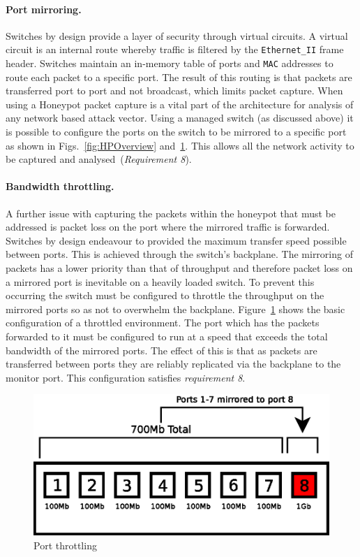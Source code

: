 \documentclass{llncs}
\begin{document}
\paragraph{Port mirroring.}
Switches by design provide a layer of security through virtual
circuits. A virtual circuit is an internal route whereby traffic is filtered by
the \texttt{Ethernet\_II} frame header. Switches maintain an in-memory table of
ports and \texttt{MAC} addresses to route each packet to a specific port. The
result of this routing is that packets are transferred port to port and not
broadcast, which limits packet capture. When using a Honeypot packet capture is
a vital part of the architecture for analysis of any network based attack
vector. Using a managed switch (as discussed above) it is possible to configure
the ports on the switch to be mirrored to a specific port as shown in
Figs.~\ref{fig:HPOverview} and~\ref{fig:throttling}. This allows all the
network activity to be captured and analysed~(\emph{Requirement 8}).

\paragraph{Bandwidth throttling.} 
A further issue with capturing the packets within the honeypot that must be
addressed is packet loss on the port where the mirrored traffic is forwarded.
Switches by design endeavour to provided the maximum transfer speed possible
between ports. This is achieved through the switch's backplane. The mirroring
of packets has a lower priority than that of throughput and therefore packet
loss on a mirrored port is inevitable on a heavily loaded switch. To prevent
this occurring the switch must be configured to throttle the throughput on the
mirrored ports so as not to overwhelm the backplane.
Figure~\ref{fig:throttling} shows the basic configuration of a throttled
environment. The port which has the packets forwarded to it must be configured
to run at a speed that exceeds the total bandwidth of the mirrored ports. The
effect of this is that as packets are transferred between ports they are
reliably replicated via the backplane to the monitor port. This configuration
satisfies \emph{requirement 8}.

\begin{figure}[h]
\begin{center}
	\includegraphics[scale=0.4]{Images/Throttle.eps}
\caption{Port throttling\label{fig:throttling}}
\end{center}
\end{figure}
\end{document}
